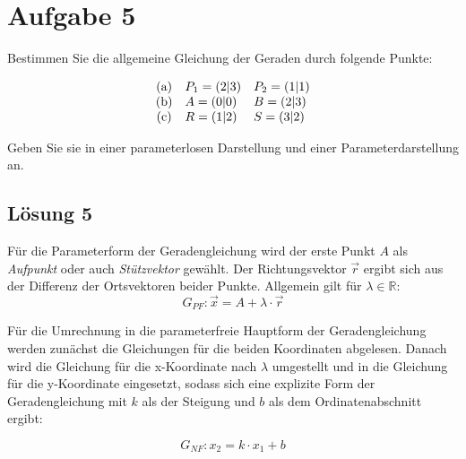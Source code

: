\section{Aufgabe 5}

Bestimmen Sie die allgemeine Gleichung der Geraden durch folgende Punkte:

\begin{equation*}
	\begin{array}{ c l l }
		\text{(a)} & P_{1} =( 2|3) & P_{2} =( 1|1)\\
		\text{(b)} & A=( 0|0) & B=( 2|3)\\
		\text{(c)} & R=( 1|2) & S=( 3|2)
	\end{array}
\end{equation*}

Geben Sie sie in einer parameterlosen Darstellung und einer Parameterdarstellung an.

\subsection{Lösung 5}
Für die Parameterform der Geradengleichung wird der erste Punkt $\displaystyle A$ als \textit{Aufpunkt} oder auch \textit{Stützvektor} gewählt. Der Richtungsvektor $\displaystyle \vec{r}$ ergibt sich aus der Differenz der Ortsvektoren beider Punkte. Allgemein gilt für $\displaystyle \lambda \in \mathbb{R}$:
\begin{equation*}
	G_{PF} : \vec{x}=A+\lambda \cdot \vec{r}
\end{equation*}

Für die Umrechnung in die parameterfreie Hauptform der Geradengleichung werden zunächst die Gleichungen für die beiden Koordinaten abgelesen. Danach wird die Gleichung für die x-Koordinate nach $\displaystyle \lambda $ umgestellt und in die Gleichung für die y-Koordinate eingesetzt, sodass sich eine explizite Form der Geradengleichung mit $\displaystyle k$ als der Steigung und $\displaystyle b$ als dem Ordinatenabschnitt ergibt:

\begin{equation*}
	G_{NF} : x_2 = k\cdot x_1 + b
\end{equation*}

